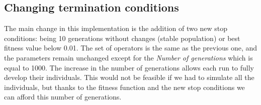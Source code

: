 \documentclass[a4paper,twoside]{article}
\begin{document}
\subsection{Changing termination conditions} \label{E2}

The main change in this implementation is the addition of two new stop conditions: being 10 generations without changes (stable population) or best fitness value below 0.01. 
The set of operators is the same as the previous one, and the parameters remain 
unchanged except for the \textit{Number of generations} which is equal to 1000. 
The increase in the number of generations allows each run to fully develop 
their individuals. This would not be feasible if we had to simulate all the 
individuals, but thanks to the fitness function and the new stop conditions we 
can afford this number of generations.
\end{document}
